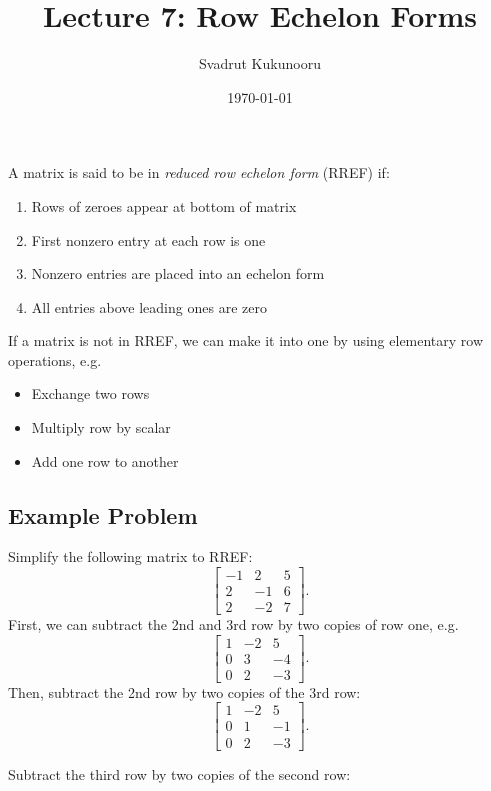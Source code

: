 \documentclass[letterpaper]{report}
\title{Lecture 7: Row Echelon Forms}
\author{Svadrut Kukunooru}
\date{\today}
\begin{document}
\begin{titlepage}
    \maketitle
\end{titlepage}

A matrix  is said to be in \textit{reduced row echelon form} (RREF) if: 
\begin{enumerate}
    \item Rows of zeroes appear at bottom of matrix
    \item First nonzero entry at each row is one
    \item Nonzero entries are placed into an echelon form
    \item All entries above leading ones are zero 
\end{enumerate}
If a matrix is not in RREF, we can make it into one by using elementary row operations, e.g.
\begin{itemize}
    \item  Exchange two rows
    \item Multiply row by scalar
    \item Add one row to another
\end{itemize}
\subsection{Example Problem}%
\label{sub:Example Problem}
Simplify the following matrix to RREF: 
\[
\begin{bmatrix} 
    -1 & 2 & 5 \\
    2 & -1 & 6 \\ 
    2 & -2 & 7
\end{bmatrix} 
.\] 
First, we can subtract the 2nd and 3rd row by two copies of row one, e.g.
\[
\begin{bmatrix} 
    1 & -2 & 5 \\
    0 & 3 & -4 \\
    0 & 2 & -3
\end{bmatrix} 
.\] 
Then, subtract the 2nd row by two copies of the 3rd row:
\[
\begin{bmatrix} 
    1 & -2 & 5 \\
    0 & 1 & -1 \\
    0 & 2 & -3
\end{bmatrix} 
.\] 

Subtract the third row by two copies of the second row: 
\end{document}
